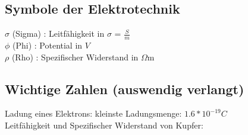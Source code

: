 \documentclass[a4paper,12pt,]{article}
\begin{document}
\subsection{Symbole der Elektrotechnik}

$\sigma$ (Sigma) : Leitfähigkeit in $\sigma$ = $\frac{S}{m}$\\
$\phi$ (Phi) : Potential in $V$\\
$\rho$ (Rho) : Spezifischer Widerstand in $\Omega$m

\subsection{Wichtige Zahlen (auswendig verlangt)}

Ladung eines Elektrons:
kleinste Ladungsmenge: $1.6*10^{-19} C$\\
Leitfähigkeit und Spezifischer Widerstand von Kupfer:
\end{document}
